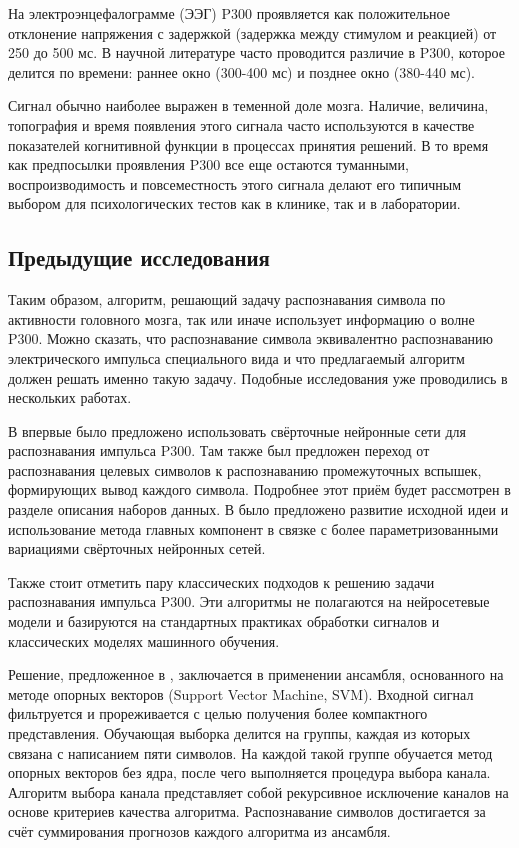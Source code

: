 \documentclass[12pt]{article}
\begin{document}
На электроэнцефалограмме (ЭЭГ) P300 проявляется как положительное отклонение напряжения с задержкой (задержка между стимулом и реакцией) от 250 до 500 мс. В научной литературе часто проводится различие в P300, которое делится по времени: раннее окно (300-400 мс) и позднее окно (380-440 мс).

Сигнал обычно наиболее выражен в теменной доле мозга. Наличие, величина, топография и время появления этого сигнала часто используются в качестве показателей когнитивной функции в процессах принятия решений. В то время как предпосылки проявления P300 все еще остаются туманными, воспроизводимость и повсеместность этого сигнала делают его типичным выбором для психологических тестов как в клинике, так и в лаборатории.

\subsection{Предыдущие исследования}
\label{p300_res}

Таким образом, алгоритм, решающий задачу распознавания символа по активности головного мозга, так или иначе использует информацию о волне P300. Можно сказать, что распознавание символа эквивалентно распознаванию электрического импульса специального вида и что предлагаемый алгоритм должен решать именно такую задачу. Подобные исследования уже проводились в нескольких работах. 

В \cite{cecotti2010convolutional} впервые было предложено использовать свёрточные нейронные сети для распознавания импульса P300. Там также был предложен переход от распознавания целевых символов к распознаванию промежуточных вспышек, формирующих вывод каждого символа. Подробнее этот приём будет рассмотрен в разделе описания наборов данных. В \cite{li2020novel} было предложено развитие исходной идеи и использование метода главных компонент в связке с более параметризованными вариациями свёрточных нейронных сетей. 

Также стоит отметить пару классических подходов к решению задачи распознавания импульса P300. Эти алгоритмы не полагаются на нейросетевые модели и базируются на стандартных практиках обработки сигналов и классических моделях машинного обучения.

Решение, предложенное в \cite{rakotomamonjy2008bci}, заключается в применении ансамбля, основанного на методе опорных векторов (Support Vector Machine, SVM). Входной сигнал фильтруется и прореживается с целью получения более компактного представления. Обучающая выборка делится на группы, каждая из которых связана с написанием пяти символов. На каждой такой группе обучается метод опорных векторов без ядра, после чего выполняется процедура выбора канала. Алгоритм выбора канала представляет собой рекурсивное исключение каналов на основе критериев качества алгоритма. Распознавание символов достигается за счёт суммирования прогнозов каждого алгоритма из ансамбля.
    
\end{document}
